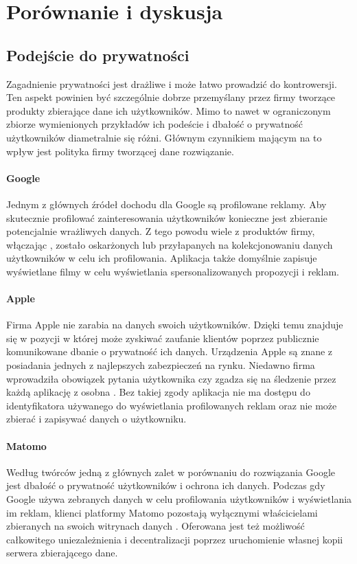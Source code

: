 \section{Porównanie i dyskusja}

\subsection{Podejście do prywatności}
Zagadnienie prywatności jest drażliwe i może łatwo prowadzić do kontrowersji. Ten aspekt powinien być szczególnie dobrze przemyślany przez firmy tworzące produkty zbierające dane ich użytkowników. Mimo to nawet w ograniczonym zbiorze wymienionych przykładów ich podeście i dbałość o prywatność użytkowników diametralnie się różni. Głównym czynnikiem mającym na to wpływ jest polityka firmy tworzącej dane rozwiązanie.

\paragraph{Google}
Jednym z głównych źródeł dochodu dla Google są profilowane reklamy. Aby skutecznie profilować zainteresowania użytkowników konieczne jest zbieranie potencjalnie wrażliwych danych. Z tego powodu wiele z produktów firmy, włączając , zostało oskarżonych lub przyłapanych na kolekcjonowaniu danych użytkowników w celu ich profilowania. Aplikacja  także domyślnie zapisuje wyświetlane filmy w celu wyświetlania spersonalizowanych propozycji i reklam.

\paragraph{Apple}
Firma Apple nie zarabia na danych swoich użytkowników. Dzięki temu znajduje się w pozycji w której może zyskiwać zaufanie klientów poprzez publicznie komunikowane dbanie o prywatność ich danych. Urządzenia Apple są znane z posiadania jednych z najlepszych zabezpieczeń na rynku. Niedawno firma wprowadziła obowiązek pytania użytkownika czy zgadza się na śledzenie przez każdą aplikację z osobna \cite{Apple_Ad_Transparency}. Bez takiej zgody aplikacja nie ma dostępu do identyfikatora używanego do wyświetlania profilowanych reklam oraz nie może zbierać i zapisywać danych o użytkowniku.

\paragraph{Matomo}
Według twórców jedną z głównych zalet  w porównaniu do rozwiązania Google jest dbałość o prywatność użytkowników i ochrona ich danych. Podczas gdy Google używa zebranych danych w celu profilowania użytkowników i wyświetlania im reklam, klienci platformy Matomo pozostają wyłącznymi właścicielami zbieranych na swoich witrynach danych \cite{Matomo_Data}. Oferowana jest też możliwość całkowitego uniezależnienia i decentralizacji poprzez uruchomienie własnej kopii serwera zbierającego dane.

